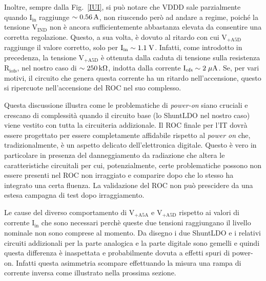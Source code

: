 Inoltre, sempre dalla Fig.~\ref{IUI}, si può notare che VDDD sale parzialmente quando $\mathrm{I_{in}}$ raggiunge $\sim0.56\rm \, A$, non riuscendo però ad andare a regime, poiché la tensione $\mathrm{V_{IND}}$ non è ancora sufficientemente abbastanza elevata da consentire una corretta regolazione. Questo, a sua volta, è dovuto al ritardo con cui $\mathrm{V_{+A5D}}$ raggiunge il valore corretto, solo per $\mathrm{I_{in}\sim 1.1\rm \; V}$. Infatti, come introdotto in precedenza, la tensione  $\mathrm{V_{+A5D}}$ è ottenuta dalla caduta di tensione sulla resistenza $\mathrm{R_{iofs}}$, nel nostro caso di $\sim 250{\rm \, k\Omega}$, indotta dalla corrente $\mathrm{I_{ofs} \sim 2 \; \mu \rm A}$. Se, per vari motivi, il circuito che genera questa corrente ha un ritardo nell'accensione, questo si ripercuote nell'accensione del ROC nel suo complesso.  

Questa discussione illustra come le problematiche di {\em power-on} siano cruciali e crescano di complessit\`a quando il circuito base (lo ShuntLDO nel nostro caso) viene vestito con tutta la circuiteria addizionale. Il ROC finale per l'IT dovr\`a essere progettato per essere completamente affidabile rispetto al {\em power on} che, tradizionalmente, \`e un aspetto delicato dell'elettronica digitale. Questo \`e vero in particolare in presenza del danneggiamento da radiazione che altera le caratteristiche circuitali per cui, potenzialmente, certe problematiche possono non essere presenti nel ROC non irraggiato e comparire dopo che lo stesso ha integrato una certa fluenza. La validazione del ROC non pu\`o prescidere da una estesa campagna di test dopo irraggiamento.

Le cause del diverso comportamento di $\mathrm{V_{+A5A}}$ e $\mathrm{V_{+A5D}}$ rispetto ai valori di corrente $\mathrm{I_{in}}$ che sono necessari perch\`e queste due tensioni raggiungano il livello nominale non sono comprese al momento. Da disegno i due ShuntLDO e i relativi circuiti addizionali per la parte analogica e la parte digitale sono gemelli e quindi questa differenza \`e inaspettata e probabilmente dovuta a effetti spuri di power-on. Infatti questa asimmetria scompare effettuando la misura una rampa di corrente inversa come illustrato nella prossima sezione.

% 
%
%

